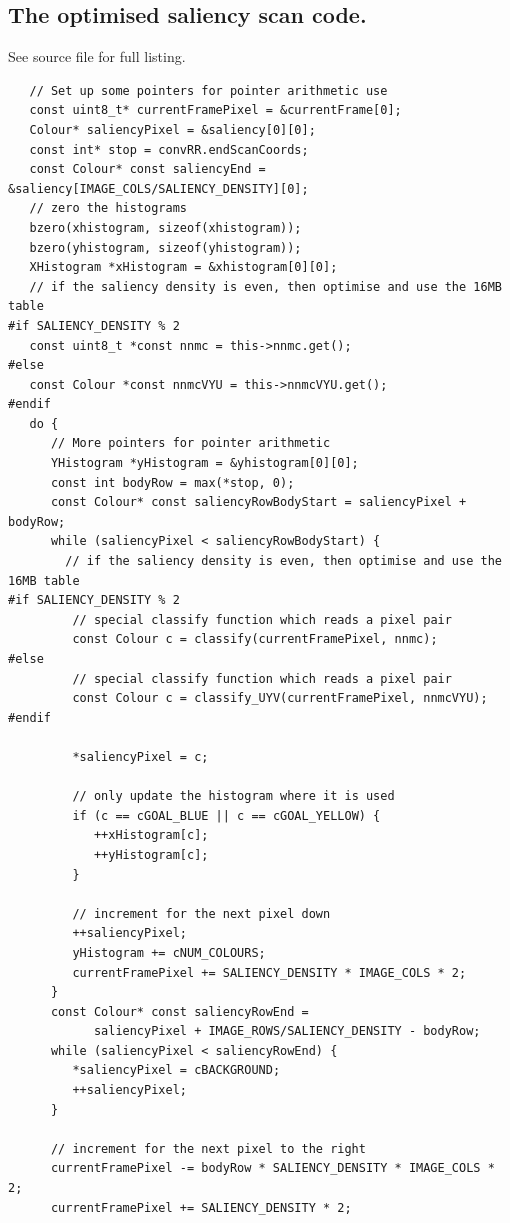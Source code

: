 \documentclass[pdftex,11pt,a4paper]{report}
\begin{document}
\begin{notesfornextyear}
\section{The optimised saliency scan code.}
See source file for full listing.
\lstset{language=C++}
\begin{lstlisting}
   // Set up some pointers for pointer arithmetic use
   const uint8_t* currentFramePixel = &currentFrame[0];
   Colour* saliencyPixel = &saliency[0][0];
   const int* stop = convRR.endScanCoords;
   const Colour* const saliencyEnd = &saliency[IMAGE_COLS/SALIENCY_DENSITY][0];
   // zero the histograms
   bzero(xhistogram, sizeof(xhistogram));
   bzero(yhistogram, sizeof(yhistogram));
   XHistogram *xHistogram = &xhistogram[0][0];
   // if the saliency density is even, then optimise and use the 16MB table
#if SALIENCY_DENSITY % 2
   const uint8_t *const nnmc = this->nnmc.get();
#else
   const Colour *const nnmcVYU = this->nnmcVYU.get();
#endif
   do {
      // More pointers for pointer arithmetic
      YHistogram *yHistogram = &yhistogram[0][0];
      const int bodyRow = max(*stop, 0);
      const Colour* const saliencyRowBodyStart = saliencyPixel + bodyRow;
      while (saliencyPixel < saliencyRowBodyStart) {
        // if the saliency density is even, then optimise and use the 16MB table
#if SALIENCY_DENSITY % 2
         // special classify function which reads a pixel pair
         const Colour c = classify(currentFramePixel, nnmc);
#else
         // special classify function which reads a pixel pair
         const Colour c = classify_UYV(currentFramePixel, nnmcVYU);
#endif

         *saliencyPixel = c;

         // only update the histogram where it is used
         if (c == cGOAL_BLUE || c == cGOAL_YELLOW) {
            ++xHistogram[c];
            ++yHistogram[c];
         }

         // increment for the next pixel down
         ++saliencyPixel;
         yHistogram += cNUM_COLOURS;
         currentFramePixel += SALIENCY_DENSITY * IMAGE_COLS * 2;
      }
      const Colour* const saliencyRowEnd =
            saliencyPixel + IMAGE_ROWS/SALIENCY_DENSITY - bodyRow;
      while (saliencyPixel < saliencyRowEnd) {
         *saliencyPixel = cBACKGROUND;
         ++saliencyPixel;
      }

      // increment for the next pixel to the right
      currentFramePixel -= bodyRow * SALIENCY_DENSITY * IMAGE_COLS * 2;
      currentFramePixel += SALIENCY_DENSITY * 2;


\end{lstlisting}
\end{notesfornextyear}
\end{document}
